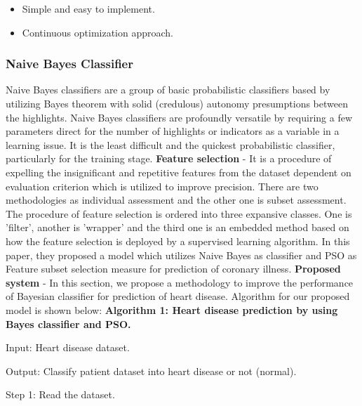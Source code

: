 \documentclass[oneside,12pt]{Classes/VTU}
\begin{document}
    \begin{itemize}
    	\item Simple and easy to implement.
    	\item Continuous optimization approach.
    \end{itemize}

    \subsubsection{Naive Bayes Classifier}
    Naive Bayes classifiers are a group of basic probabilistic classifiers based by utilizing Bayes theorem with solid (credulous) autonomy presumptions between the highlights. Naive Bayes classifiers are profoundly versatile by requiring a few parameters direct for the number of highlights or indicators as a variable in a learning issue. It is the least difficult and the quickest probabilistic classifier, particularly for the training stage.    
    \linebreak
    \linebreak                
    \textbf{Feature selection} - It is a procedure of expelling the insignificant and repetitive features from the dataset dependent on evaluation criterion which is utilized to improve precision. There are two methodologies as individual assessment and the other one is subset assessment. The procedure of feature selection is ordered into three expansive classes. One is 'filter', another is 'wrapper' and the third one is an embedded method based on how the feature selection is deployed by a supervised learning algorithm. In this paper, they proposed a model which utilizes Naive Bayes as classifier and PSO as Feature subset selection measure for prediction of coronary illness.
    \linebreak
    \linebreak                
    \textbf{Proposed system} - In this section, we propose a methodology to improve the performance of Bayesian classifier for prediction of heart disease. Algorithm for our proposed model is shown below:
    \linebreak
    \linebreak
    \textbf{Algorithm 1: Heart disease prediction by using Bayes classifier and PSO.}
    
    Input: Heart disease dataset.
    
    Output: Classify patient dataset into heart disease or not (normal).
    
    Step 1: Read the dataset.
    
\end{document}
